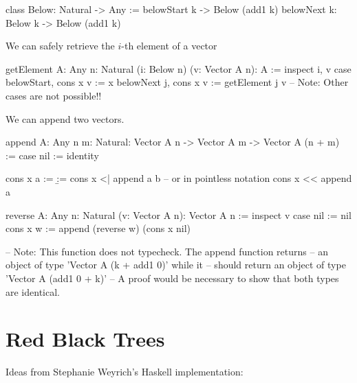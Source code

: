 \begin{alba}
    class
        Below: Natural -> Any
    :=
        belowStart {k} -> Below (add1 k)
        belowNext {k}: Below k -> Below (add1 k)
\end{alba}


We can safely retrieve the $i$-th element of a vector

\begin{alba}
    getElement {A: Any} {n: Natural} (i: Below n) (v: Vector A n): A :=
        inspect
            i, v
        case
            belowStart, cons x v :=
                x
            belowNext j, cons x v :=
                getElement j v
        -- Note: Other cases are not possible!!
\end{alba}

We can append two vectors.

\begin{alba}
    append
        {A: Any} {n m: Natural}:
        Vector A n -> Vector A m -> Vector A (n + m)
    :=
        case
            nil :=
                identity

            cons x a :=
                \b :=
                    cons x <| append a b
                -- or in pointless notation
                cons x << append a
\end{alba}


\begin{alba}
    reverse {A: Any} {n: Natural} (v: Vector A n): Vector A n
    :=
        inspect v case
            nil := nil
            cons x w := append (reverse w) (cons x nil)

    -- Note: This function does not typecheck. The append function returns
    --       an object of type 'Vector A (k + add1 0)' while it
    --       should return an object of type 'Vector A (add1 0 + k)'
    -- A proof would be necessary to show that both types are identical.
\end{alba}







\section{Red Black Trees}

Ideas from Stephanie Weyrich's Haskell implementation:

